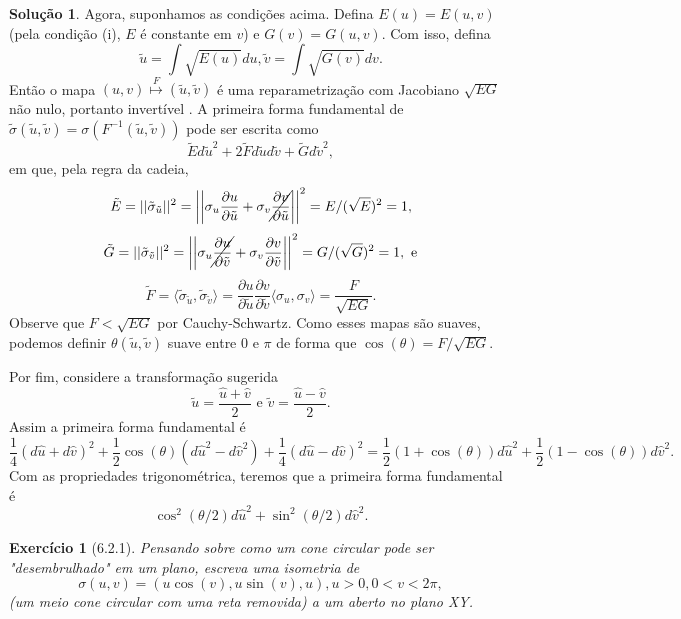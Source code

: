 \documentclass[a4paper,12pt]{article}
\theoremstyle{exer}
\newtheorem{exercise}{Exercício}
\theoremstyle{definition}
\newtheorem{solution}{Solução}
\theoremstyle{plain}
\begin{document}
\begin{solution}
    Agora, suponhamos as condições acima. Defina $E(u) = E(u,v)$ (pela
    condição (i), $E$ é constante em $v$) e $G(v) = G(u,v)$. Com isso, defina
    $$\tilde{u} = \int \sqrt{E(u)}du, \tilde{v} = \int
    \sqrt{G(v)} dv.$$
    Então o mapa $(u,v) \overset{F}{\mapsto} (\tilde{u}, \tilde{v})$ é uma reparametrização
    com Jacobiano $\sqrt{EG}$ não nulo, portanto invertível \cite[Proposição 4.2.7]{pressley}. A primeira forma fundamental de
    $\tilde{\sigma}(\tilde{u}, \tilde{v}) = \sigma(F^{-1}(\tilde{u},\tilde{v}))$ pode ser escrita como 
    $$
    \tilde{E}d\tilde{u}^2 + 2\tilde{F}d\tilde{u}d\tilde{v} + \tilde{G}d\tilde{v}^2,  
    $$
    em que, pela regra da cadeia, 
    $$
    \tilde{E} = ||\tilde{\sigma}_{\tilde{u}}||^2  = \left|\left|\sigma_u\frac{\partial u}{\partial \tilde{u}} + \sigma_v\cancel{\frac{\partial v}{\partial \tilde{u}}} \right|\right|^2 = E/(\sqrt{E})^2 = 1, 
    $$
    $$
    \tilde{G} = ||\tilde{\sigma}_{\tilde{v}}||^2  = \left|\left|\sigma_u\cancel{\frac{\partial u}{\partial \tilde{v}}} + \sigma_v\frac{\partial v}{\partial \tilde{v}} \right|\right|^2 = G/(\sqrt{G})^2 = 1, \text{ e}
    $$
    $$
    \tilde{F} = \langle \tilde{\sigma}_{\tilde{u}}, \tilde{\sigma}_{\tilde{v}} \rangle = \frac{\partial u}{\partial \tilde{u}}\frac{\partial v}{\partial \tilde{v}}\langle \sigma_u, \sigma_v \rangle = \frac{F}{\sqrt{EG}}.
    $$
    Observe que $F < \sqrt{EG}$ por Cauchy-Schwartz. Como esses mapas são
    suaves, podemos definir $\theta(\tilde{u},\tilde{v})$ suave entre 0 e
    $\pi$ de forma que $\cos(\theta) = F/\sqrt{EG}$. 

    Por fim, considere a transformação sugerida
    $$
    \tilde{u} = \frac{\hat{u} + \hat{v}}{2} \text{ e } \tilde{v} = \frac{\hat{u} - \hat{v}}{2}. 
    $$
    Assim a primeira forma fundamental é 
    $$
    \frac{1}{4}(d\hat{u} + d\hat{v})^2 + \frac{1}{2}\cos(\theta)(d\hat{u}^2 - d\hat{v}^2) + \frac{1}{4}(d\hat{u} - d\hat{v})^2 = \frac{1}{2}(1 + \cos(\theta))d\hat{u}^2 + \frac{1}{2}(1 - \cos(\theta))d\hat{v}^2.
    $$
    Com as propriedades trigonométrica, teremos que a primeira forma
    fundamental é 
    $$
    \cos^2(\theta/2)d\hat{u}^2 + \sin^2(\theta/2)d\hat{v}^2.
    $$

    

\end{solution}

\begin{exercise}[6.2.1]
    Pensando sobre como um cone circular pode ser "desembrulhado" em um plano,
    escreva uma isometria de 
    $$
    \sigma(u,v) = (u\cos(v), u\sin(v), u), u > 0, 0 < v < 2\pi,
    $$
    (um meio cone circular com uma reta removida) a um aberto no plano XY. 
\end{exercise}
\end{document}
